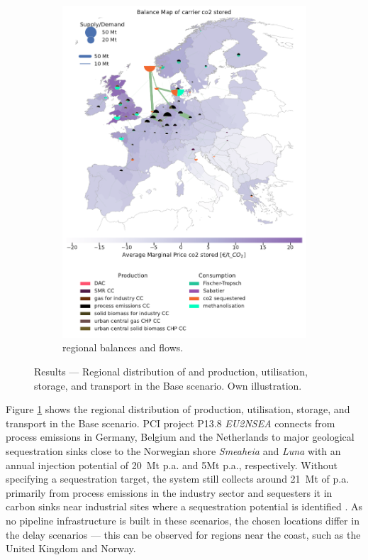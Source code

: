 \documentclass[10pt]{article}
\let\autocite\cite
\begin{document}
\begin{figure}[h!]
\begin{subfigure}[t]{0.495\textwidth}
        \includegraphics[width=\textwidth]{balance_map_co2} %
        \caption{ regional balances and flows.}
        \label{fig:balance_map_co2}
    \end{subfigure}
    \caption{Results --- Regional distribution of  and  production, utilisation, storage, and transport in the Base scenario. Own illustration.}
    \label{fig:balance_maps}
\end{figure}

Figure \ref{fig:balance_map_co2} shows the regional distribution of  production, utilisation, storage, and transport in the Base scenario. PCI project P13.8 \textit{EU2NSEA} connects  from process emissions in Germany, Belgium and the Netherlands to major geological sequestration sinks close to the Norwegian shore \textit{Smeaheia} and \textit{Luna} with an annual injection potential of \SI{20}{Mt} p.a. and {5}{Mt} p.a., respectively. 
Without specifying a  sequestration target, the system still collects around \SI{21}{Mt} of  p.a. primarily from process emissions in the industry sector and sequesters it in carbon sinks near industrial sites where a sequestration potential is identified \autocite{hofmannH2CO2Network2024}. As no pipeline infrastructure is built in these scenarios, the chosen locations differ in the delay scenarios --- this can be observed for regions near the coast, such as the United Kingdom and Norway.
\end{document}
